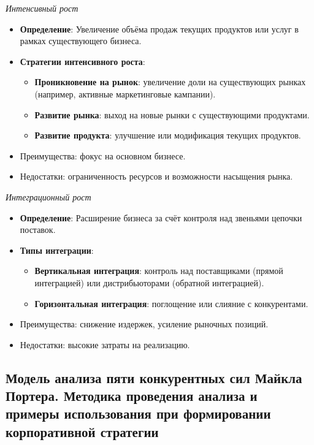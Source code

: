 \textit{Интенсивный рост}
\begin{itemize}
    \item \textbf{Определение}: Увеличение объёма продаж текущих продуктов или услуг в рамках существующего бизнеса.
    \item \textbf{Стратегии интенсивного роста}:
    \begin{itemize}
        \item \textbf{Проникновение на рынок}: увеличение доли на существующих рынках (например, активные маркетинговые кампании).
        \item \textbf{Развитие рынка}: выход на новые рынки с существующими продуктами.
        \item \textbf{Развитие продукта}: улучшение или модификация текущих продуктов.
    \end{itemize}
    \item Преимущества: фокус на основном бизнесе.
    \item Недостатки: ограниченность ресурсов и возможности насыщения рынка.
\end{itemize}

\textit{Интеграционный рост}
\begin{itemize}
    \item \textbf{Определение}: Расширение бизнеса за счёт контроля над звеньями цепочки поставок.
    \item \textbf{Типы интеграции}:
    \begin{itemize}
        \item \textbf{Вертикальная интеграция}: контроль над поставщиками (прямой интеграцией) или дистрибьюторами (обратной интеграцией).
        \item \textbf{Горизонтальная интеграция}: поглощение или слияние с конкурентами.
    \end{itemize}
    \item Преимущества: снижение издержек, усиление рыночных позиций.
    \item Недостатки: высокие затраты на реализацию.
\end{itemize}



\pagebreak
\subsection{Модель анализа пяти конкурентных сил Майкла Портера. Методика проведения анализа и примеры использования при формировании корпоративной стратегии}

